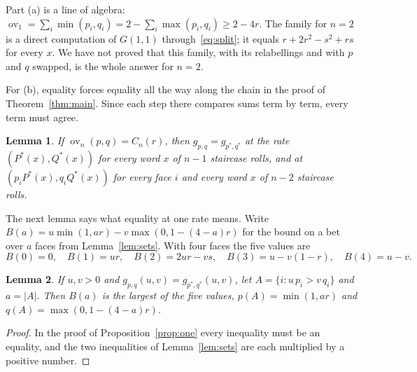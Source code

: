 \documentclass[11pt]{article}
\newtheorem{lemma}{Lemma}
\theoremstyle{remark}
\newcommand{\ov}{\operatorname{ov}}
\begin{document}
Part (a) is a line of algebra: $\ov_1=\sum_i\min(p_i,q_i)=2-\sum_i\max(p_i,q_i)\ge 2-4r$. The family for
$n=2$ is a direct computation of $G(1,1)$ through~\eqref{eq:split}; it equals
$r+2r^2-s^2+rs$ for every $x$. We have not proved that this family, with its relabellings and with $p$ and $q$
swapped, is the whole answer for $n=2$.

For (b), equality forces equality all the way along the chain in the proof of Theorem~\ref{thm:main}. Since
each step there compares sums term by term, every term must agree.

\begin{lemma}\label{lem:rates}
If $\ov_n(p,q)=C_n(r)$, then $g_{p,q}=g_{p^*,q^*}$ at the rate $(P^*(x),Q^*(x))$ for every word $x$ of
$n-1$ staircase rolls, and at $(p_i P^*(x),q_i Q^*(x))$ for every face $i$ and every word $x$ of $n-2$
staircase rolls.
\end{lemma}

The next lemma says what equality at one rate means. Write $B(a)=u\min(1,ar)-v\max(0,1-(4-a)r)$ for the bound
on a bet over $a$ faces from Lemma~\ref{lem:sets}. With four faces the five values are
\[
B(0)=0,\quad B(1)=ur,\quad B(2)=2ur-vs,\quad B(3)=u-v(1-r),\quad B(4)=u-v .
\]

\begin{lemma}\label{lem:tight}
If $u,v>0$ and $g_{p,q}(u,v)=g_{p^*,q^*}(u,v)$, let $A=\{i:u\,p_i>v\,q_i\}$ and $a=|A|$. Then $B(a)$ is the
largest of the five values, $p(A)=\min(1,ar)$ and $q(A)=\max(0,1-(4-a)r)$.
\end{lemma}

\begin{proof}
In the proof of Proposition~\ref{prop:one} every inequality must be an equality, and the two inequalities of
Lemma~\ref{lem:sets} are each multiplied by a positive number.
\end{proof}
\end{document}
